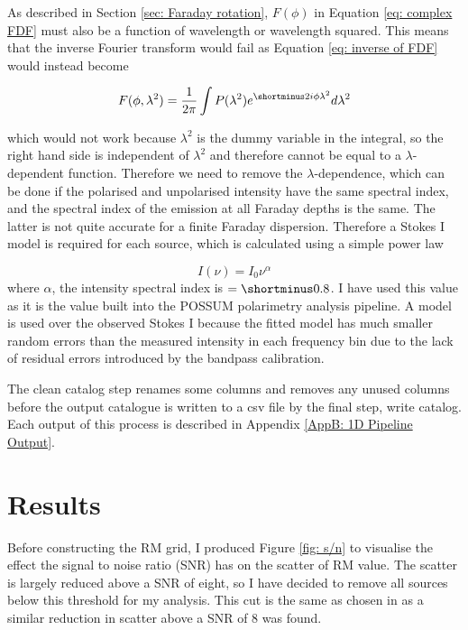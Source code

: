 As described in Section \ref{sec: Faraday rotation}, $F(\phi)$ in Equation \ref{eq: complex FDF} must also be a function of wavelength or wavelength squared. This means that the inverse Fourier transform would fail as Equation \ref{eq: inverse of FDF} would instead become 

\begin{equation}
    F(\phi, \lambda^2) = \frac{1}{2\pi} \int P(\lambda^2)e^{\shortminus2i\phi\lambda^2}d\lambda^2
    \label{eq: failed FT}
\end{equation}

\noindent which would not work because $\lambda^2$ is the dummy variable in the integral, so the right hand side is independent of $\lambda^2$ and therefore cannot be equal to a $\lambda$-dependent function. Therefore we need to remove the $\lambda$-dependence, which can be done if the polarised and unpolarised intensity have the same spectral index, and the spectral index of the emission at all Faraday depths is the same. The latter is not quite accurate for a finite Faraday dispersion. Therefore a Stokes I model is required for each source, which is calculated using a simple power law 

\begin{equation}
    I(\nu) = I_0 \nu^{\alpha}
    \label{eq: spectral index}
\end{equation}
\noindent where $\alpha$, the intensity spectral index is $=\shortminus0.8$. I have used this value as it is the value built into the POSSUM polarimetry analysis pipeline. A model is used over the observed Stokes I because the fitted model has much smaller random errors than the measured intensity in each frequency bin due to the lack of residual errors introduced by the bandpass calibration. 

The clean catalog step renames some columns and removes any unused columns before the output catalogue is written to a csv file by the final step, write catalog. Each output of this process is described in Appendix \ref{AppB: 1D Pipeline Output}.


\section{Results}

Before constructing the RM grid, I produced Figure \ref{fig: s/n} to visualise the effect the signal to noise ratio (SNR) has on the scatter of RM value. The scatter is largely reduced above a SNR of eight, so I have decided to remove all sources below this threshold for my analysis. This cut is the same as chosen in \cite{vanderwoude2024prototypefaradayrotationmeasure} as a similar reduction in scatter above a SNR of 8 was found.


